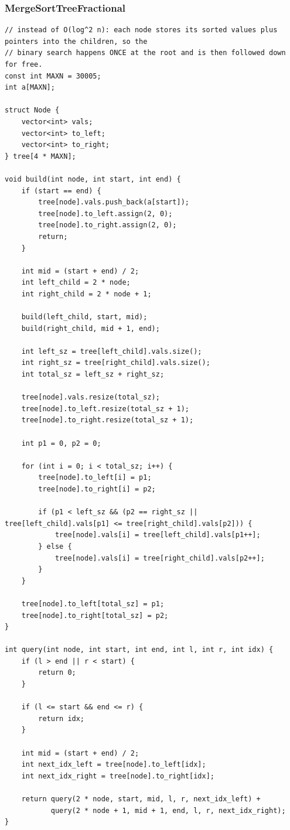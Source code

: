 \documentclass[9pt,a4paper,twocolumn]{extarticle}
\begin{document}
\filbreak
\subsubsection{MergeSortTreeFractional}
\nopagebreak
\begin{lstlisting}
// instead of O(log^2 n): each node stores its sorted values plus pointers into the children, so the
// binary search happens ONCE at the root and is then followed down for free.
const int MAXN = 30005;
int a[MAXN];

struct Node {
    vector<int> vals;
    vector<int> to_left; 
    vector<int> to_right;
} tree[4 * MAXN];

void build(int node, int start, int end) {
    if (start == end) {
        tree[node].vals.push_back(a[start]);
        tree[node].to_left.assign(2, 0); 
        tree[node].to_right.assign(2, 0);
        return;
    }

    int mid = (start + end) / 2;
    int left_child = 2 * node;
    int right_child = 2 * node + 1;

    build(left_child, start, mid);
    build(right_child, mid + 1, end);

    int left_sz = tree[left_child].vals.size();
    int right_sz = tree[right_child].vals.size();
    int total_sz = left_sz + right_sz;

    tree[node].vals.resize(total_sz);
    tree[node].to_left.resize(total_sz + 1);
    tree[node].to_right.resize(total_sz + 1);

    int p1 = 0, p2 = 0;
    
    for (int i = 0; i < total_sz; i++) {
        tree[node].to_left[i] = p1;
        tree[node].to_right[i] = p2;

        if (p1 < left_sz && (p2 == right_sz || tree[left_child].vals[p1] <= tree[right_child].vals[p2])) {
            tree[node].vals[i] = tree[left_child].vals[p1++];
        } else {
            tree[node].vals[i] = tree[right_child].vals[p2++];
        }
    }
    
    tree[node].to_left[total_sz] = p1;
    tree[node].to_right[total_sz] = p2;
}

int query(int node, int start, int end, int l, int r, int idx) {
    if (l > end || r < start) {
        return 0;
    }

    if (l <= start && end <= r) {
        return idx;
    }

    int mid = (start + end) / 2;
    int next_idx_left = tree[node].to_left[idx];
    int next_idx_right = tree[node].to_right[idx];

    return query(2 * node, start, mid, l, r, next_idx_left) + 
           query(2 * node + 1, mid + 1, end, l, r, next_idx_right);
}
\end{lstlisting}
\end{document}
